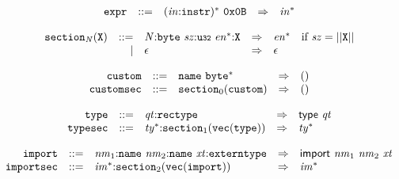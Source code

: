 \vspace{1ex}

$$
\begin{array}{@{}l@{}rrlll@{}l@{}}
& {\mathtt{expr}} &::=& {({\mathit{in}}{:}{\mathtt{instr}})^\ast}~\mathtt{0x0B} &\Rightarrow& {{\mathit{in}}^\ast} \\
\end{array}
$$

\vspace{1ex}

\vspace{1ex}

$$
\begin{array}{@{}l@{}rrlll@{}l@{}}
& {{\mathtt{section}}}_{{\mathit{N}}}({\mathtt{X}}) &::=& {\mathit{N}}{:}{\mathtt{byte}}~{\mathit{sz}}{:}{\mathtt{u{\scriptstyle32}}}~{{\mathit{en}}^\ast}{:}{\mathtt{X}} &\Rightarrow& {{\mathit{en}}^\ast} &\quad
  \mbox{if}~{\mathit{sz}} = ||{\mathtt{X}}|| \\ &&|&
\epsilon &\Rightarrow& \epsilon \\
\end{array}
$$

\vspace{1ex}

$$
\begin{array}{@{}l@{}rrlll@{}l@{}}
& {\mathtt{custom}} &::=& {\mathtt{name}}~{{\mathtt{byte}}^\ast} &\Rightarrow& () \\
& {\mathtt{customsec}} &::=& {{\mathtt{section}}}_{0}({\mathtt{custom}}) &\Rightarrow& () \\
\end{array}
$$

\vspace{1ex}

$$
\begin{array}{@{}l@{}rrlll@{}l@{}}
& {\mathtt{type}} &::=& {\mathit{qt}}{:}{\mathtt{rectype}} &\Rightarrow& \mathsf{type}~{\mathit{qt}} \\
& {\mathtt{typesec}} &::=& {{\mathit{ty}}^\ast}{:}{{\mathtt{section}}}_{1}({\mathtt{vec}}({\mathtt{type}})) &\Rightarrow& {{\mathit{ty}}^\ast} \\
\end{array}
$$

\vspace{1ex}

$$
\begin{array}{@{}l@{}rrlll@{}l@{}}
& {\mathtt{import}} &::=& {\mathit{nm}}_{{1}}{:}{\mathtt{name}}~{\mathit{nm}}_{{2}}{:}{\mathtt{name}}~{\mathit{xt}}{:}{\mathtt{externtype}} &\Rightarrow& \mathsf{import}~{\mathit{nm}}_{{1}}~{\mathit{nm}}_{{2}}~{\mathit{xt}} \\
& {\mathtt{importsec}} &::=& {{\mathit{im}}^\ast}{:}{{\mathtt{section}}}_{2}({\mathtt{vec}}({\mathtt{import}})) &\Rightarrow& {{\mathit{im}}^\ast} \\
\end{array}
$$

